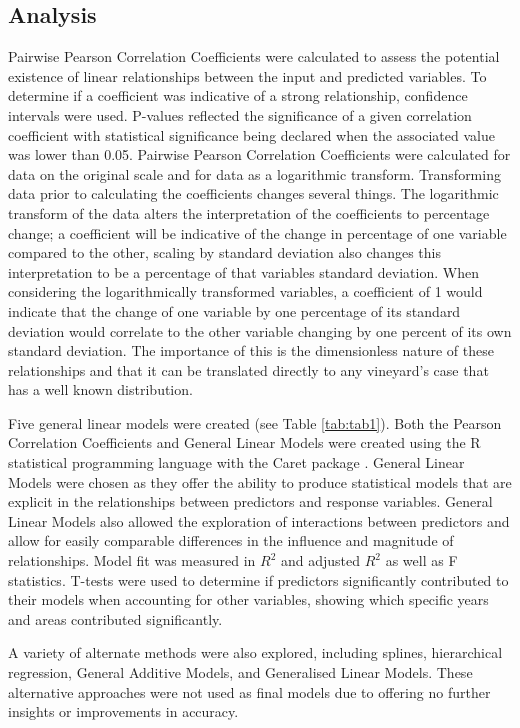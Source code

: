 \documentclass[review,12pt,authoryear]{elsarticle}
\begin{document}
\begin{linenumbers}
\subsection{Analysis}
Pairwise Pearson Correlation Coefficients were calculated to assess the potential existence of linear relationships between the input and predicted variables. To determine if a coefficient was indicative of a strong relationship, confidence intervals were used. P-values reflected the significance of a given correlation coefficient with statistical significance being declared when the associated value was lower than 0.05. Pairwise Pearson Correlation Coefficients were calculated for data on the original scale and for data as a logarithmic transform. Transforming data prior to calculating the coefficients changes several things. The logarithmic transform of the data alters the interpretation of the coefficients to percentage change; a coefficient will be indicative of the change in percentage of one variable compared to the other, scaling by standard deviation also changes this interpretation to be a percentage of that variables standard deviation. When considering the logarithmically transformed variables, a coefficient of 1 would indicate that the change of one variable by one percentage of its standard deviation would correlate to the other variable changing by one percent of its own standard deviation. The importance of this is the dimensionless nature of these relationships and that it can be translated directly to any vineyard's case that has a well known distribution.
\par
Five general linear models were created (see Table \ref{tab:tab1}). Both the Pearson Correlation Coefficients and General Linear Models were created using the R statistical programming language \citep{rcoreteamLanguageEnvironmentStatistical2021} with the Caret package \citep{kuhnBuildingPredictiveModels2008}. General Linear Models were chosen as they offer the ability to produce statistical models that are explicit in the relationships between predictors and response variables.  General Linear Models also allowed the exploration of interactions between predictors and allow for easily comparable differences in the influence and magnitude of relationships. Model fit was measured in $R^2$ and adjusted $R^2$ as well as F statistics. T-tests were used to determine if predictors significantly contributed to their models when accounting for other variables, showing which specific years and areas contributed significantly. 
\par
A variety of alternate methods were also explored, including splines, hierarchical regression, General Additive Models, and Generalised Linear Models. These alternative approaches were not used as final models due to offering no further insights or improvements in accuracy.
\par

\end{linenumbers}
\end{document}
